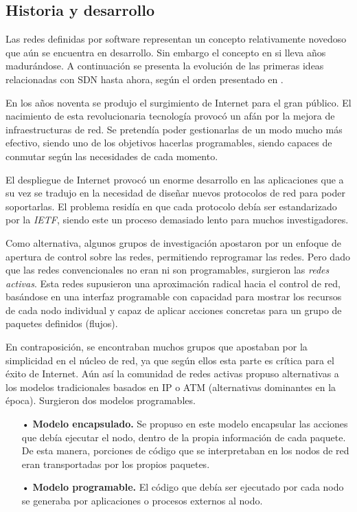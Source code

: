 \documentclass[a4paper,11pt]{book}
\begin{document}
\subsection{Historia y desarrollo}
Las redes definidas por software representan un concepto relativamente novedoso que aún se encuentra en desarrollo. Sin embargo el concepto en si lleva años madurándose. A continuación se presenta la evolución de las primeras ideas relacionadas con \ac{SDN} hasta ahora, según el orden presentado en \cite{feamster2013road}.

En los años noventa se produjo el surgimiento de Internet para el gran público. El nacimiento de esta revolucionaria tecnología provocó un afán por la mejora de infraestructuras de red. Se pretendía poder gestionarlas de un modo mucho más efectivo, siendo uno de los objetivos hacerlas programables, siendo capaces de conmutar según las necesidades de cada momento.

El despliegue de Internet provocó un enorme desarrollo en las aplicaciones que a su vez se tradujo en la necesidad de diseñar nuevos protocolos de red para poder soportarlas. El problema residía en que cada protocolo debía ser estandarizado por la \emph{\ac{IETF}}, siendo este un proceso demasiado lento para muchos investigadores.

Como alternativa, algunos grupos de investigación apostaron por un enfoque de apertura de control sobre las redes, permitiendo reprogramar las redes. Pero dado que las redes convencionales no eran ni son programables, surgieron las \textit{redes activas}. Esta redes supusieron una aproximación radical hacia el control de red, basándose en una interfaz programable con capacidad para mostrar los recursos de cada nodo individual y capaz de aplicar acciones concretas para un grupo de paquetes definidos (flujos).

En contraposición, se encontraban muchos grupos que apostaban por la simplicidad en el núcleo de red, ya que según ellos esta parte es crítica para el éxito de Internet. Aún así la comunidad de redes activas propuso alternativas a los modelos tradicionales basados en \ac{IP} o \ac{ATM} (alternativas dominantes en la época). Surgieron dos modelos programables.

\begin{itemize}
\item[•] \textbf{Modelo encapsulado.} Se propuso en este modelo encapsular las acciones que debía ejecutar el nodo, dentro de la propia información de cada paquete. De esta manera, porciones de código que se interpretaban en los nodos de red eran transportadas por los propios paquetes.
\item[•] \textbf{Modelo programable.} El código que debía ser ejecutado por cada nodo se generaba por aplicaciones o procesos externos al nodo.
\end{itemize}
\end{document}
